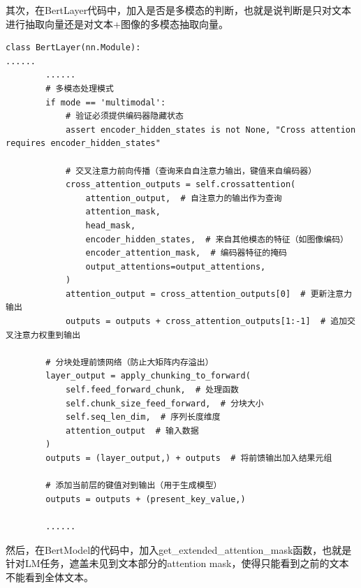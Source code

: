 \documentclass[zihao=false,fontset=windows]{ctexart}
\begin{document}
其次，在BertLayer代码中，加入是否是多模态的判断，也就是说判断是只对文本进行抽取向量还是对文本+图像的多模态抽取向量。\par
\begin{feishucode}
\begin{lstlisting}
class BertLayer(nn.Module):
......
        ......
        # 多模态处理模式
        if mode == 'multimodal':
            # 验证必须提供编码器隐藏状态
            assert encoder_hidden_states is not None, "Cross attention requires encoder_hidden_states"
            
            # 交叉注意力前向传播（查询来自自注意力输出，键值来自编码器）
            cross_attention_outputs = self.crossattention(
                attention_output,  # 自注意力的输出作为查询
                attention_mask,
                head_mask,
                encoder_hidden_states,  # 来自其他模态的特征（如图像编码）
                encoder_attention_mask,  # 编码器特征的掩码
                output_attentions=output_attentions,
            )
            attention_output = cross_attention_outputs[0]  # 更新注意力输出
            outputs = outputs + cross_attention_outputs[1:-1]  # 追加交叉注意力权重到输出

        # 分块处理前馈网络（防止大矩阵内存溢出）
        layer_output = apply_chunking_to_forward(
            self.feed_forward_chunk,  # 处理函数
            self.chunk_size_feed_forward,  # 分块大小
            self.seq_len_dim,  # 序列长度维度
            attention_output  # 输入数据
        )
        outputs = (layer_output,) + outputs  # 将前馈输出加入结果元组

        # 添加当前层的键值对到输出（用于生成模型）
        outputs = outputs + (present_key_value,)
        
        ......
\end{lstlisting}
\end{feishucode}
然后，在BertModel的代码中，加入get\_extended\_attention\_mask函数，也就是针对LM任务，遮盖未见到文本部分的attention mask，使得只能看到之前的文本不能看到全体文本。\par
\end{document}

